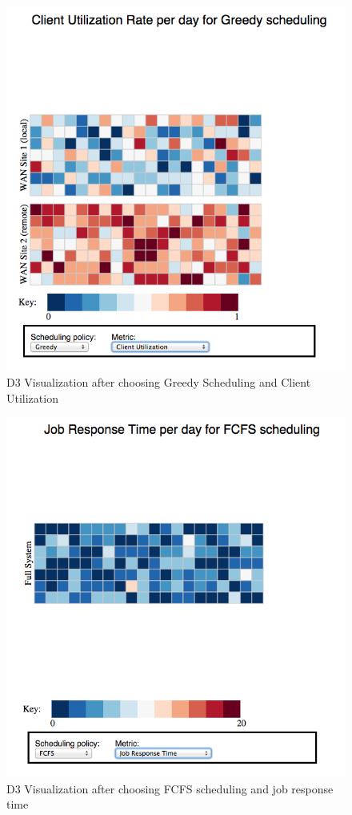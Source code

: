 \documentclass[11pt]{article}
\numberwithin{figure}{section}
\begin{document}
\begin{figure}[ht]
	\centering
		\includegraphics[width=5in]{fig2.png}
	\caption{D3 Visualization after choosing Greedy Scheduling and Client Utilization}
	\label{fig:greedy}
\end{figure}

\begin{figure}[ht]
	\centering
		\includegraphics[width=5in]{fig3.png}
	\caption{D3 Visualization after choosing FCFS scheduling and job response time}
	\label{fig:job}
\end{figure}
\end{document}
